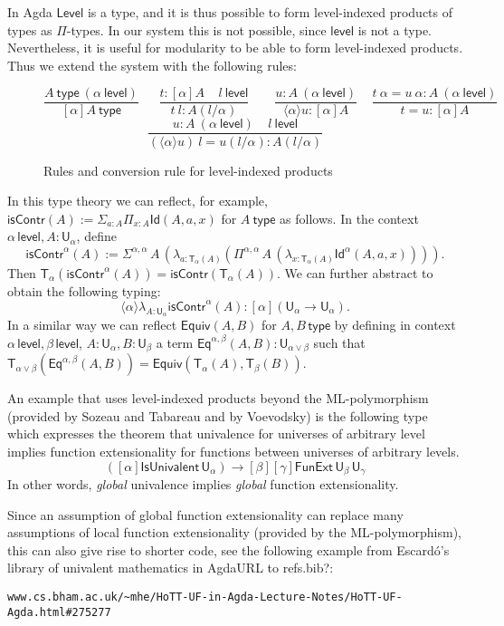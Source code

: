 \documentclass[11pt,a4paper]{article}
\theoremstyle{definition}
\newcommand{\Id}{\mathsf{Id}}
\newcommand{\Eq}{\mathsf{Eq}}
\newcommand{\UU}{\mathsf{U}}
\newcommand{\AgdaLevel}{\mathsf{Level}}
\newcommand{\Level}{\mathsf{level}}
\newcommand{\type}{\mathsf{type}}
\newcommand{\lam}[1]{{\langle}#1{\rangle}}
\newcommand{\mylam}[3]{\lambda_{#1:#2}#3}
\newcommand{\mypi}[3]{\Pi_{#1:#2}#3}
\newcommand{\Upi}[3]{\Pi^{#1}\,#2\,#3}
\newcommand{\mysig}[3]{\Sigma_{#1:#2}#3}
\newcommand{\Usig}[3]{\Sigma^{#1}\,#2\,#3}
\newcommand{\T}{\mathsf{T}}
\newcommand{\Equiv}{\mathsf{Equiv}}
\newcommand{\isContr}{\mathsf{isContr}}
\begin{document}
In Agda $\AgdaLevel$ is a type,
and it is thus possible to form level-indexed products of types as $\Pi$-types.
In our system this is not possible, since $\Level$ is not a type. Nevertheless, it is useful for modularity to be able to form level-indexed products. Thus we extend the system with the following rules:
\begin{figure}[H]
  \caption{Rules and conversion rule for level-indexed products}%
  \label{fig:levindprod}
$$
\frac{A~\type~(\alpha~\Level)}{[\alpha]A~\type}~~~~~~~
\frac{t:[\alpha]A~~~~~l~\Level}
     {t~l:A(l/\alpha)}~~~~~~~~~
\frac{u:A~(\alpha~\Level)}{\lam{\alpha}{u}: [\alpha]A}~~~~~
\frac{t~\alpha = u~\alpha:A~(\alpha~\Level)}{t = u:[\alpha]A}
$$
$$
\frac{u:A~(\alpha~\Level)~~~~~l~\Level}
{(\lam{\alpha}{u})~l = u(l/\alpha): A(l/\alpha)}
$$
\end{figure}

In this type theory we can reflect, for example, $\isContr(A) :=
\mysig{a}{A}{\mypi{x}{A}{\Id(A,a,x)}}$ for $A~\type$ as follows.
In the context $\alpha\,\Level, A: \UU_\alpha$, define
\[
\isContr^\alpha(A) :=
\Usig{\alpha,\alpha}{A}{(\mylam{a}{\T_\alpha(A)}
{(\Upi{\alpha,\alpha}{A}{(\mylam{x}{\T_\alpha(A)}{\Id^\alpha(A,a,x)})})})}.
\]
Then $\T_\alpha (\isContr^\alpha(A)) = \isContr(\T_\alpha(A))$.
We can further abstract to obtain the following typing:
\[
\lam{\alpha}{\mylam{A}{\UU_\alpha}{\isContr^\alpha(A)}} :
[\alpha](\UU_\alpha \to \UU_\alpha).
\]
In a similar way we can reflect $\Equiv(A,B)$ for $A,B\,\type$ by defining
in context $\alpha\,\Level,\beta\,\Level$, $A: \UU_\alpha, B: \UU_\beta$
a term $\Eq^{\alpha,\beta}(A,B) : \UU_{\alpha\vee\beta}$
such that $\T_{\alpha\vee\beta}(\Eq^{\alpha,\beta}(A,B))=
\Equiv(\T_{\alpha}(A),\T_{\beta}(B))$.

An example that uses level-indexed products beyond the ML-polymorphism (provided by Sozeau and Tabareau and by Voevodsky)
is the following type which
expresses the theorem that univalence for universes of arbitrary level implies
function extensionality for functions between universes of arbitrary levels.
$$
([\alpha]\mathsf{IsUnivalent}\, \UU_\alpha)
\to [\beta][\gamma] \mathsf{FunExt}\, \UU_\beta\, \UU_\gamma
$$
In other words, {\em global} univalence  implies {\em global} function extensionality. 

Since an assumption of global function extensionality can replace many assumptions of local function extensionality (provided by the ML-polymorphism), this can also give rise to shorter code, see the following example from Escard\'o's library of univalent mathematics in Agda{\color{red}URL to refs.bib?}:
\begin{verbatim}
www.cs.bham.ac.uk/~mhe/HoTT-UF-in-Agda-Lecture-Notes/HoTT-UF-Agda.html#275277
\end{verbatim}
\end{document}
